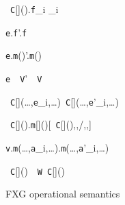 \begin{figure*}
\vspace{-\bigskipamount}
\begin{minipage}{.4\textwidth}
\quad{}
	{\new~{\tt C}[]().{\tt f}_i _i}

	{{\tt e}.{\tt f}'.{\tt f}}

	{{\tt e}.{\tt m}()'.{\tt m}()}

	{{\tt e}~\as~{\tt V}'~\as~{\tt V}}
\end{minipage}%
\begin{minipage}{.6\textwidth}
\quad{}
	{\new~{\tt C}[](\ldots,{\tt e}_i,\ldots)\derives\new~{\tt C}[](\ldots,{\tt e}'_i,\ldots)}

	{\new~{\tt C}[]().{\tt m}[]()[\new~{\tt C}[](),,/\this,,]}

	{{\tt v}.{\tt m}(\ldots,{\tt a}_i,\ldots).{\tt m}(\ldots,{\tt a}'_i,\ldots)}

	{\new~{\tt C}[]()~\as~{\tt W}\derives\new~{\tt C}[]()}
\end{minipage}

\centering
\caption{{\sf FXG} operational semantics}
\label{fig:sos}
\end{figure*}


